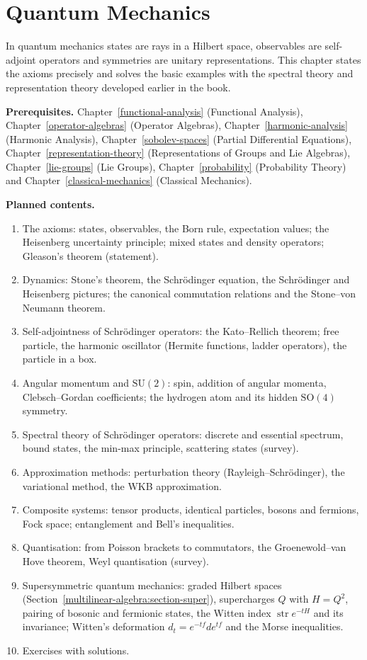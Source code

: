 \chapter{Quantum Mechanics}\label{quantum-mechanics}

In quantum mechanics states are rays in a Hilbert space, observables are self-adjoint operators and
symmetries are unitary representations. This chapter states the axioms precisely and solves the basic
examples with the spectral theory and representation theory developed earlier in the book.

\noindent\textbf{Prerequisites.} Chapter~\ref{functional-analysis} (Functional Analysis), Chapter~\ref{operator-algebras} (Operator Algebras), Chapter~\ref{harmonic-analysis} (Harmonic Analysis), Chapter~\ref{sobolev-spaces} (Partial Differential Equations), Chapter~\ref{representation-theory} (Representations of Groups and Lie Algebras), Chapter~\ref{lie-groups} (Lie Groups), Chapter~\ref{probability} (Probability Theory) and Chapter~\ref{classical-mechanics} (Classical Mechanics).

\noindent\textbf{Planned contents.}
\begin{enumerate}
\item The axioms: states, observables, the Born rule, expectation values; the Heisenberg uncertainty
principle; mixed states and density operators; Gleason's theorem (statement).
\item Dynamics: Stone's theorem, the Schr\"odinger equation, the Schr\"odinger and Heisenberg pictures;
the canonical commutation relations and the Stone--von Neumann theorem.
\item Self-adjointness of Schr\"odinger operators: the Kato--Rellich theorem; free particle, the
harmonic oscillator (Hermite functions, ladder operators), the particle in a box.
\item Angular momentum and $\mathrm{SU}(2)$: spin, addition of angular momenta, Clebsch--Gordan
coefficients; the hydrogen atom and its hidden $\mathrm{SO}(4)$ symmetry.
\item Spectral theory of Schr\"odinger operators: discrete and essential spectrum, bound states,
the min-max principle, scattering states (survey).
\item Approximation methods: perturbation theory (Rayleigh--Schr\"odinger), the variational method,
the WKB approximation.
\item Composite systems: tensor products, identical particles, bosons and fermions, Fock space;
entanglement and Bell's inequalities.
\item Quantisation: from Poisson brackets to commutators, the Groenewold--van Hove theorem, Weyl
quantisation (survey).
\item Supersymmetric quantum mechanics: graded Hilbert spaces (Section~\ref{multilinear-algebra:section-super}), supercharges $Q$ with $H = Q^2$, pairing of bosonic and fermionic states, the
Witten index $\operatorname{str}e^{-tH}$ and its invariance; Witten's deformation $d_t = e^{-tf}de^{tf}$ and the Morse inequalities.
\item Exercises with solutions.
\end{enumerate}
